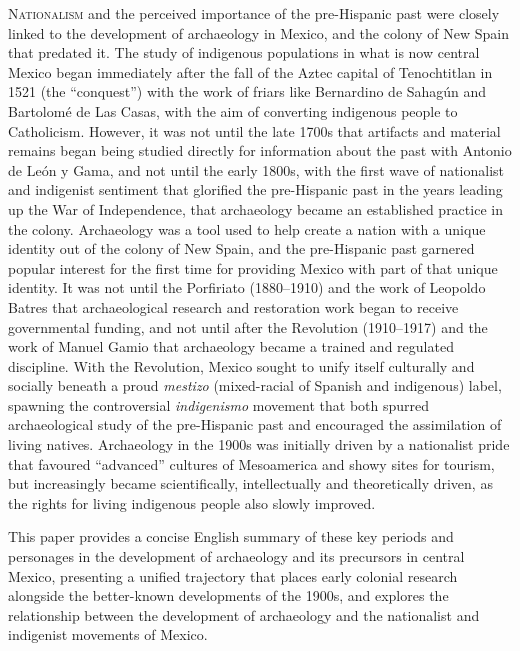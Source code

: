 \IJSRAopening
\lettrine{N}{ationalism} and the perceived importance of the pre-Hispanic past were closely linked to the development of archaeology in Mexico, and the colony of New Spain that predated it. The study of indigenous populations in what is now central Mexico began immediately after the fall of the Aztec capital of Tenochtitlan in 1521 (the “conquest”) with the work of friars like Bernardino de Sahagún and Bartolomé de Las Casas, with the aim of converting indigenous people to Catholicism. However, it was not until the late 1700s that artifacts and material remains began being studied directly for information about the past with Antonio de León y Gama, and not until the early 1800s, with the first wave of nationalist and indigenist sentiment that glorified the pre-Hispanic past in the years leading up the War of Independence, that archaeology became an established practice in the colony. Archaeology was a tool used to help create a nation with a unique identity out of the colony of New Spain, and the pre-Hispanic past garnered popular interest for the first time for providing Mexico with part of that unique identity. It was not until the Porfiriato (1880–1910) and the work of Leopoldo Batres that archaeological research and restoration work began to receive governmental funding, and not until after the Revolution (1910–1917) and the work of Manuel Gamio that archaeology became a trained and regulated discipline. With the Revolution, Mexico sought to unify itself culturally and socially beneath a proud \emph{mestizo} (mixed-racial of Spanish and indigenous) label, spawning the controversial \emph{indigenismo} 
movement that both spurred archaeological study of the pre-Hispanic past and encouraged the assimilation of living natives. Archaeology in the 1900s was initially driven by a nationalist pride that favoured “advanced” cultures of Mesoamerica and showy sites for tourism, but increasingly became scientifically, intellectually and theoretically driven, as the rights for living indigenous people also slowly improved.

This paper provides a concise English summary of these key periods and personages in the development of archaeology and its precursors in central Mexico, presenting a unified trajectory that places early colonial research alongside the better-known developments of the 1900s, and explores the relationship between the development of archaeology and the nationalist and indigenist movements of Mexico. 



